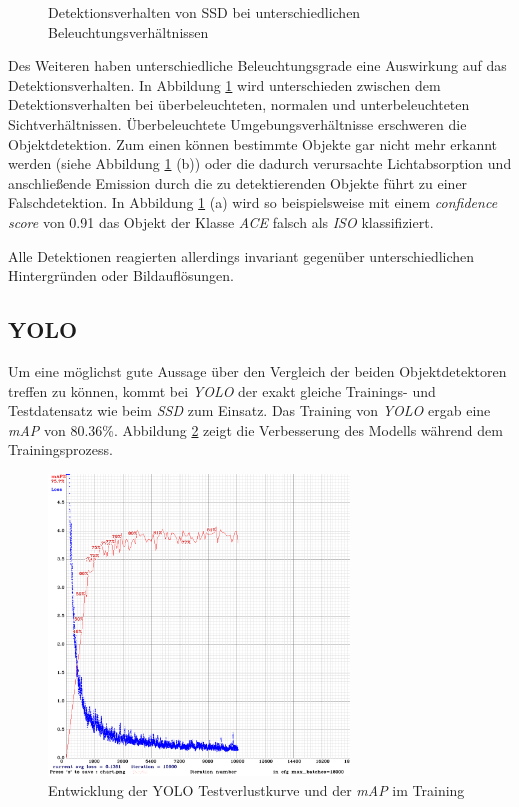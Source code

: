 \begin{figure}[H]
	\caption{Detektionsverhalten von SSD bei unterschiedlichen Beleuchtungsverhältnissen}
	\label{sicht}
\end{figure}

Des Weiteren haben unterschiedliche Beleuchtungsgrade eine Auswirkung auf das Detektionsverhalten. In Abbildung \ref{sicht} wird unterschieden zwischen dem Detektionsverhalten bei überbeleuchteten, normalen und unterbeleuchteten Sichtverhältnissen. Überbeleuchtete Umgebungsverhältnisse erschweren die Objektdetektion. Zum einen können bestimmte Objekte gar nicht mehr erkannt werden (siehe Abbildung \ref{sicht} (b)) oder die dadurch verursachte Lichtabsorption und anschließende Emission durch die zu detektierenden Objekte führt zu einer Falschdetektion. In Abbildung \ref{sicht} (a) wird so beispielsweise mit einem \textit{confidence score} von 0.91 das Objekt der Klasse \textit{ACE} falsch als \textit{ISO} klassifiziert.

Alle Detektionen reagierten allerdings invariant gegenüber unterschiedlichen Hintergründen oder Bildauflösungen.

\newpage

\subsection*{YOLO}

Um eine möglichst gute Aussage über den Vergleich der beiden Objektdetektoren treffen zu können, kommt bei \textit{YOLO} der exakt gleiche Trainings- und Testdatensatz wie beim \textit{SSD} zum Einsatz. Das Training von \textit{YOLO} ergab eine \textit{mAP} von 80.36\%. Abbildung \ref{yolo_result} zeigt die Verbesserung des Modells während dem Trainingsprozess. 

\begin{figure}[H]
	\begin{center}
		\includegraphics[width=8cm]{Bilder/yolo_result.png} 
		\caption{Entwicklung der YOLO Testverlustkurve und der \textit{mAP} im Training}
		\label{yolo_result}
	\end{center}
\end{figure}

